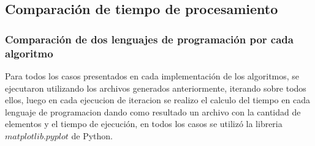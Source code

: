 \documentclass{article}
\begin{document}
		    
		    
		\subsection{Comparaci\'{o}n de tiempo de procesamiento}
		    
		        \subsubsection{Comparaci\'{o}n de dos lenguajes de programación por cada algoritmo} 
		        
		        Para todos los casos presentados en cada implementaci\'{o}n de los algoritmos, se ejecutaron utilizando los archivos generados anteriormente, iterando sobre todos ellos, luego en cada ejecucion de iteracion se realizo el calculo del tiempo en cada lenguaje de programacion dando como resultado un archivo con la cantidad de elementos y el tiempo de ejecución, en todos los casos se utilizó la libreria $matplotlib.pyplot$ de Python.
		        
\end{document}

